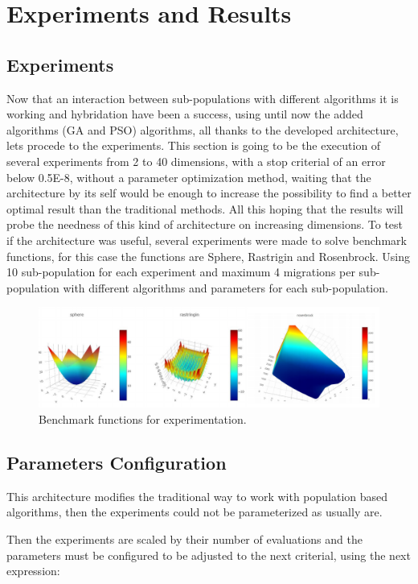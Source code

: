 \documentclass[runningheads]{llncs}
\begin{document}
\section{Experiments and Results}
\subsection{Experiments}
Now that an interaction between sub-populations with different algorithms it is working and  hybridation have been a success, using until now the added algorithms (GA and PSO) algorithms, all thanks to the 
developed architecture, lets procede to the experiments.
This section is going to be the execution of several experiments from 2 to 40 dimensions, with a stop criterial 
of an error below  0.5E-8, without a parameter optimization method, waiting that the architecture by its self
would be enough to increase the possibility to find a better optimal result than the traditional methods.
All this hoping that the results will probe the needness of this kind of architecture on increasing dimensions.
To test if the architecture was useful, several experiments were made to solve
benchmark functions, for this case the functions are Sphere, Rastrigin and Rosenbrock.
Using 10 sub-population for each experiment and maximum 4 migrations per sub-population with different algorithms and parameters for each sub-population.

\begin{figure}[htp]
    \includegraphics[width=\textwidth]{benchmark.png}
    \caption{Benchmark functions for experimentation.} \label{fig1}
    \end{figure}

\subsection{Parameters Configuration} 

This architecture modifies the traditional way to work with population based algorithms, then the experiments 
could not be parameterized as usually are.

Then the experiments are scaled by their number of evaluations and the
parameters must be configured to be adjusted to the next criterial, using the next expression:
\end{document}
